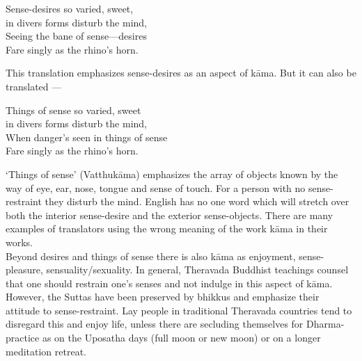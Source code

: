 \begin{MyDescription}[]{}
Sense-desires so varied, sweet,\\
in divers forms disturb the mind,\\
Seeing the bane of sense—desires\\
Fare singly as the rhino's horn.
\end{MyDescription}
   
This translation emphasizes sense-desires as an aspect of k\=ama. But it can also be translated —
   
\begin{MyDescription}[]{}
Things of sense so varied, sweet\\
in divers forms disturb the mind,\\
When danger's seen in things of sense\\
Fare singly as the rhino's horn.
\end{MyDescription}

`Things of sense' (Vatthuk\=ama) emphasizes the array of objects known by the way of eye, ear, nose, tongue and sense of touch. For a person with no sense-restraint they disturb the mind. English has no one word which will stretch over both the interior sense-desire and the exterior sense-objects. There are many examples of translators using the wrong meaning of the work k\=ama in their works.\\

Beyond desires and things of sense there is also k\=ama as enjoyment, sense-pleasure, sensuality/sexuality. In general, Theravada Buddhist teachings counsel that one should restrain one's senses and not indulge in this aspect of k\=ama. However, the Suttas have been preserved by bhikkus and emphasize their attitude to sense-restraint. Lay people in traditional Theravada countries tend to disregard this and enjoy life, unless there are secluding themselves for Dharma-practice as on the Uposatha days (full moon or new moon) or on a longer meditation retreat.\\


